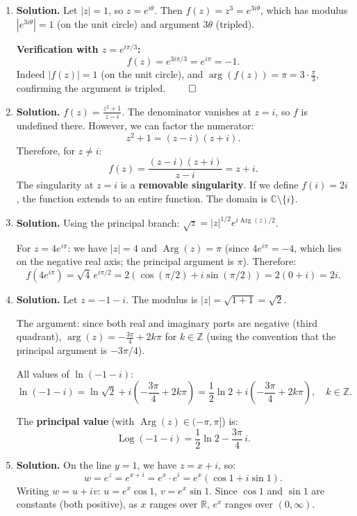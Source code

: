 \begin{enumerate}
All solutions:
\[
z = \ln 2 + i(2k+1)\pi, \quad k \in \mathbb{Z}.
\]

\item \textbf{Solution.}
Let $|z| = 1$, so $z = e^{i\theta}$. Then $f(z) = z^3 = e^{3i\theta}$, which has modulus $|e^{3i\theta}| = 1$ (on the unit circle) and argument $3\theta$ (tripled).

\textbf{Verification with $z = e^{i\pi/3}$:}
\[
f(z) = e^{3i\pi/3} = e^{i\pi} = -1.
\]
Indeed $|f(z)| = 1$ (on the unit circle), and $\arg(f(z)) = \pi = 3 \cdot \frac{\pi}{3}$, confirming the argument is tripled. $\qed$

\item \textbf{Solution.}
$f(z) = \frac{z^2 + 1}{z - i}$. The denominator vanishes at $z = i$, so $f$ is undefined there. However, we can factor the numerator:
\[
z^2 + 1 = (z - i)(z + i).
\]
Therefore, for $z \neq i$:
\[
f(z) = \frac{(z-i)(z+i)}{z-i} = z + i.
\]
The singularity at $z = i$ is a \textbf{removable singularity}. If we define $f(i) = 2i$, the function extends to an entire function. The domain is $\mathbb{C} \setminus \{i\}$.

\item \textbf{Solution.}
Using the principal branch: $\sqrt{z} = |z|^{1/2} e^{i\operatorname{Arg}(z)/2}$.

For $z = 4e^{i\pi}$: we have $|z| = 4$ and $\operatorname{Arg}(z) = \pi$ (since $4e^{i\pi} = -4$, which lies on the negative real axis; the principal argument is $\pi$). Therefore:
\[
f(4e^{i\pi}) = \sqrt{4}\, e^{i\pi/2} = 2(\cos(\pi/2) + i\sin(\pi/2)) = 2(0 + i) = 2i.
\]

\item \textbf{Solution.}
Let $z = -1 - i$. The modulus is $|z| = \sqrt{1 + 1} = \sqrt{2}$.

The argument: since both real and imaginary parts are negative (third quadrant), $\arg(z) = -\frac{3\pi}{4} + 2k\pi$ for $k \in \mathbb{Z}$ (using the convention that the principal argument is $-3\pi/4$).

All values of $\ln(-1-i)$:
\[
\ln(-1 - i) = \ln\sqrt{2} + i\!\left(-\frac{3\pi}{4} + 2k\pi\right) = \frac{1}{2}\ln 2 + i\!\left(-\frac{3\pi}{4} + 2k\pi\right), \quad k \in \mathbb{Z}.
\]

The \textbf{principal value} (with $\operatorname{Arg}(z) \in (-\pi, \pi]$) is:
\[
\operatorname{Log}(-1 - i) = \frac{1}{2}\ln 2 - \frac{3\pi}{4}\,i.
\]

\item \textbf{Solution.}
On the line $y = 1$, we have $z = x + i$, so:
\[
w = e^z = e^{x+i} = e^x \cdot e^i = e^x(\cos 1 + i\sin 1).
\]
Writing $w = u + iv$: $u = e^x \cos 1$, $v = e^x \sin 1$. Since $\cos 1$ and $\sin 1$ are constants (both positive), as $x$ ranges over $\mathbb{R}$, $e^x$ ranges over $(0, \infty)$.


\end{enumerate}

